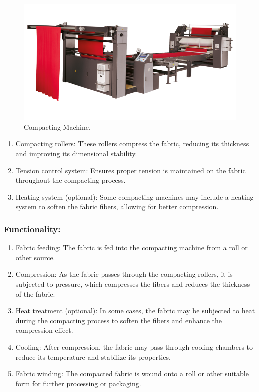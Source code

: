\begin{figure}[h!]
  \centering
  \includegraphics[width=0.8\linewidth]{figs/production/image4.png}
  \caption{Compacting Machine.}
  \label{fig:Compacting Machine.}
\end{figure}


\begin{enumerate}
\item
  Compacting rollers: These rollers compress the fabric, reducing its
  thickness and improving its dimensional stability.
\item
  Tension control system: Ensures proper tension is maintained on the
  fabric throughout the compacting process.
\item
  Heating system (optional): Some compacting machines may include a
  heating system to soften the fabric fibers, allowing for better
  compression.
\end{enumerate}

\subsubsection{Functionality:}

\begin{enumerate}
\item
  Fabric feeding: The fabric is fed into the compacting machine from a
  roll or other source.
\item
  Compression: As the fabric passes through the compacting rollers, it
  is subjected to pressure, which compresses the fibers and reduces the
  thickness of the fabric.
\item
  Heat treatment (optional): In some cases, the fabric may be subjected
  to heat during the compacting process to soften the fibers and enhance
  the compression effect.
\item
  Cooling: After compression, the fabric may pass through cooling
  chambers to reduce its temperature and stabilize its properties.
\item
  Fabric winding: The compacted fabric is wound onto a roll or other
  suitable form for further processing or packaging.
\end{enumerate}


